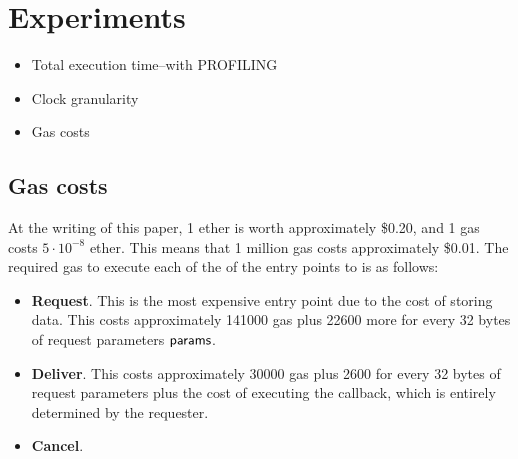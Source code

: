 \section{Experiments}

\begin{itemize}
\item Total execution time--with PROFILING
\item Clock granularity
\item Gas costs
\end{itemize}

\subsection{Gas costs}

At the writing of this paper, 1 ether is worth approximately \$0.20, and 1 gas costs $5 \cdot 10^{-8}$ ether.
This means that 1 million gas costs approximately \$0.01.
The required gas to execute each of the of the entry points to \tcont is as follows:
\begin{itemize}
  \item {\bf Request}.
    This is the most expensive entry point due to the cost of storing data.
    This costs approximately 141000 gas plus 22600 more for every 32 bytes of request parameters ${\sf params}$.

  \item {\bf Deliver}.
    This costs approximately 30000 gas plus 2600 for every 32 bytes of request parameters
    plus the cost of executing the callback, which is entirely determined by the requester.

  \item {\bf Cancel}.
\end{itemize}


